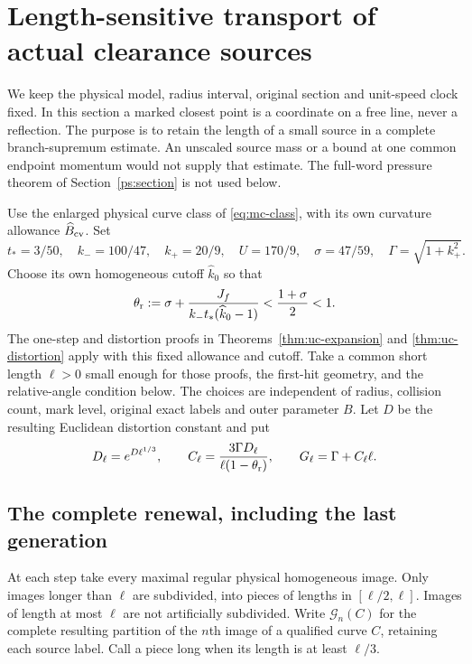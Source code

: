 \section{Length-sensitive transport of actual clearance sources}
\label{sec:lc-length}

We keep the physical model, radius interval, original section and unit-speed
clock fixed.  In this section a marked closest point is a coordinate on a
free line, never a reflection.  The purpose is to retain the length of a
small source in a complete branch-supremum estimate.  An unscaled source
mass or a bound at one common endpoint momentum would not supply that
estimate.  The full-word pressure theorem of Section~\ref{ps:section}
is not used below.

Use the enlarged physical curve class of \eqref{eq:mc-class}, with its own
curvature allowance $\widehat B_{\rm cv}$.  Set
\[
 t_*=3/50,\quad k_-=100/47,\quad k_+=20/9,\quad U=170/9,
 \quad \sigma=47/59,\quad \Gamma=\sqrt{1+k_+^2}.
\]
Choose its own homogeneous cutoff $\widehat k_0$ so that
\begin{equation}\label{eq:lc-theta}
 \theta_{\rm r}:=\sigma+
       \frac{J_f}{k_-t_*(\widehat k_0-1)}
                 <\frac{1+\sigma}{2}<1.
\end{equation}
The one-step and distortion proofs in
Theorems~\ref{thm:uc-expansion} and \ref{thm:uc-distortion} apply with
this fixed allowance and cutoff.  Take a common short length $\ell>0$
small enough for those proofs, the first-hit geometry, and the
relative-angle condition below.  The choices are independent of radius,
collision count, mark level, original exact labels and outer parameter $B$.
Let $D$ be the resulting Euclidean distortion constant and put
\begin{equation}\label{eq:lc-renewal-constants}
 D_\ell=e^{D\ell^{1/3}},\qquad
 C_\ell=\frac{3\Gamma D_\ell}{\ell(1-\theta_{\rm r})},\qquad
 G_\ell=\Gamma+C_\ell\ell.
\end{equation}

\subsection{The complete renewal, including the last generation}

At each step take every maximal regular physical homogeneous image.
Only images longer than $\ell$ are subdivided, into pieces of lengths
in $[\ell/2,\ell]$.  Images of length at most $\ell$ are not artificially
subdivided.  Write $\mathcal G_n(C)$ for the complete resulting partition
of the $n$th image of a qualified curve $C$, retaining each source label.
Call a piece long when its length is at least $\ell/3$.

